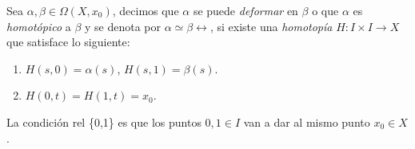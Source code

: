 \begin{definicion}
\label{def:homotopia_relativa_lazos}
    Sea $\alpha,\beta\in \Omega(X,x_0)$, decimos que $\alpha$ se puede \textit{deformar} en $\beta$ o que $\alpha$ es \textit{homotópico} a $\beta$ y se denota por $\alpha \simeq\beta \rel$,  si existe una \textit{homotopía} $H:I\times I\to X$ que satisface lo siguiente:
    \begin{enumerate}
        \item $H(s,0)=\alpha(s)$, $H(s,1)=\beta(s)$.
        \item $H(0,t)=H(1,t)=x_0$.
    \end{enumerate}
\end{definicion}

La condición rel \{0,1\} es que los puntos $0,1\in I$ van a dar al mismo punto $x_0\in X$.

